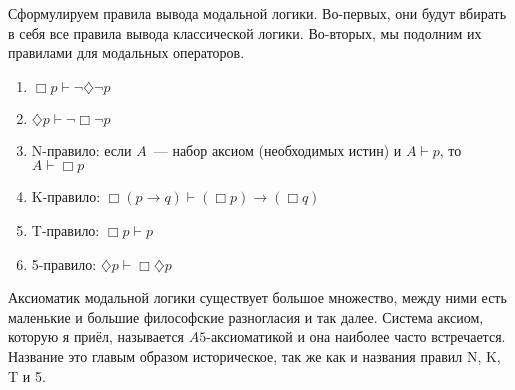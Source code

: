 Сформулируем правила вывода модальной логики. Во-первых, они будут вбирать в себя все правила вывода классической логики. Во-вторых, мы подолним их правилами для модальных операторов. 

\begin{enumerate}
\item $\Box p \vdash \neg \diamondsuit \neg p$
\item $\diamondsuit p \vdash \neg \Box \neg p$
\item N-правило: если $A$~--- набор аксиом (необходимых истин) и $A\vdash p$, то $A\vdash \Box p$
\item K-правило: $\Box (p\to q) \vdash (\Box p) \to (\Box q)$
\item T-правило: $\Box p \vdash p$
\item 5-правило: $\diamondsuit p \vdash \Box \diamondsuit p$
\end{enumerate}

Аксиоматик модальной логики существует большое множество, между ними есть маленькие и большие философские разногласия и так далее. Система аксиом, которую я приёл, называется $A5$-аксиоматикой и она наиболее часто встречается. Название это главым образом историческое, так же как и названия правил N, K, T и 5.

